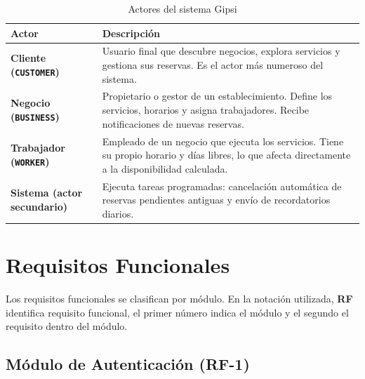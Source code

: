 \documentclass[12pt,a4paper,twoside]{report}
\begin{document}
\begin{table}[H]
\centering
\caption{Actores del sistema Gipsi}
\label{tab:actores}
\begin{tabularx}{\textwidth}{>{\bfseries}lX}
\toprule
Actor & Descripción \\
\midrule
Cliente (\texttt{CUSTOMER}) & Usuario final que descubre negocios, explora servicios y gestiona sus reservas. Es el actor más numeroso del sistema. \\[0.5em]
Negocio (\texttt{BUSINESS}) & Propietario o gestor de un establecimiento. Define los servicios, horarios y asigna trabajadores. Recibe notificaciones de nuevas reservas. \\[0.5em]
Trabajador (\texttt{WORKER}) & Empleado de un negocio que ejecuta los servicios. Tiene su propio horario y días libres, lo que afecta directamente a la disponibilidad calculada. \\[0.5em]
Sistema (actor secundario) & Ejecuta tareas programadas: cancelación automática de reservas pendientes antiguas y envío de recordatorios diarios. \\
\bottomrule
\end{tabularx}
\end{table}

\section{Requisitos Funcionales}

Los requisitos funcionales se clasifican por módulo. En la notación utilizada, \textbf{RF} identifica requisito funcional, el primer número indica el módulo y el segundo el requisito dentro del módulo.

\subsection{Módulo de Autenticación (RF-1)}
\end{document}
